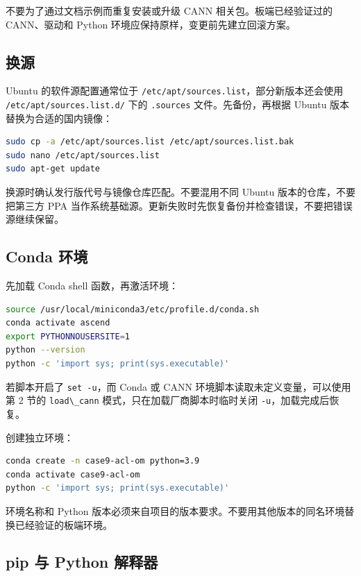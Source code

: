 不要为了通过文档示例而重复安装或升级 CANN 相关包。板端已经验证过的
CANN、驱动和 Python 环境应保持原样，变更前先建立回滚方案。

\subsection{换源}\label{ux6362ux6e90}

Ubuntu 的软件源配置通常位于
\passthrough{\lstinline!/etc/apt/sources.list!}，部分新版本还会使用
\passthrough{\lstinline!/etc/apt/sources.list.d/!} 下的
\passthrough{\lstinline!.sources!} 文件。先备份，再根据 Ubuntu
版本替换为合适的国内镜像：

\begin{lstlisting}[language=bash]
sudo cp -a /etc/apt/sources.list /etc/apt/sources.list.bak
sudo nano /etc/apt/sources.list
sudo apt-get update
\end{lstlisting}

换源时确认发行版代号与镜像仓库匹配。不要混用不同 Ubuntu
版本的仓库，不要把第三方 PPA
当作系统基础源。更新失败时先恢复备份并检查错误，不要把错误源继续保留。

\subsection{Conda 环境}\label{conda-ux73afux5883}

先加载 Conda shell 函数，再激活环境：

\begin{lstlisting}[language=bash]
source /usr/local/miniconda3/etc/profile.d/conda.sh
conda activate ascend
export PYTHONNOUSERSITE=1
python --version
python -c 'import sys; print(sys.executable)'
\end{lstlisting}

若脚本开启了 \passthrough{\lstinline!set -u!}，而 Conda 或 CANN
环境脚本读取未定义变量，可以使用第 2 节的
\passthrough{\lstinline!load\_cann!} 模式，只在加载厂商脚本时临时关闭
\passthrough{\lstinline!-u!}，加载完成后恢复。

创建独立环境：

\begin{lstlisting}[language=bash]
conda create -n case9-acl-om python=3.9
conda activate case9-acl-om
python -c 'import sys; print(sys.executable)'
\end{lstlisting}

环境名称和 Python
版本必须来自项目的版本要求。不要用其他版本的同名环境替换已经验证的板端环境。

\subsection{pip 与 Python
解释器}\label{pip-ux4e0e-python-ux89e3ux91caux5668}

